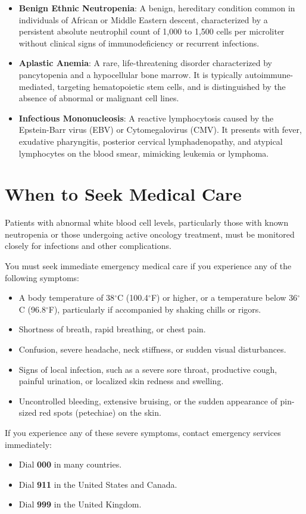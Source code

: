\begin{itemize}
  \item \textbf{Benign Ethnic Neutropenia}: A benign, hereditary condition common in individuals of African or Middle Eastern descent, characterized by a persistent absolute neutrophil count of 1,000 to 1,500 cells per microliter without clinical signs of immunodeficiency or recurrent infections.
  \item \textbf{Aplastic Anemia}: A rare, life-threatening disorder characterized by pancytopenia and a hypocellular bone marrow. It is typically autoimmune-mediated, targeting hematopoietic stem cells, and is distinguished by the absence of abnormal or malignant cell lines.
  \item \textbf{Infectious Mononucleosis}: A reactive lymphocytosis caused by the Epstein-Barr virus (EBV) or Cytomegalovirus (CMV). It presents with fever, exudative pharyngitis, posterior cervical lymphadenopathy, and atypical lymphocytes on the blood smear, mimicking leukemia or lymphoma.
\end{itemize}

\section*{When to Seek Medical Care}
Patients with abnormal white blood cell levels, particularly those with known neutropenia or those undergoing active oncology treatment, must be monitored closely for infections and other complications.

You must seek immediate emergency medical care if you experience any of the following symptoms:
\begin{itemize}
  \item A body temperature of 38$^\circ$C (100.4$^\circ$F) or higher, or a temperature below 36$^\circ$C (96.8$^\circ$F), particularly if accompanied by shaking chills or rigors.
  \item Shortness of breath, rapid breathing, or chest pain.
  \item Confusion, severe headache, neck stiffness, or sudden visual disturbances.
  \item Signs of local infection, such as a severe sore throat, productive cough, painful urination, or localized skin redness and swelling.
  \item Uncontrolled bleeding, extensive bruising, or the sudden appearance of pin-sized red spots (petechiae) on the skin.
\end{itemize}

If you experience any of these severe symptoms, contact emergency services immediately:
\begin{itemize}
  \item Dial \textbf{000} in many countries.
  \item Dial \textbf{911} in the United States and Canada.
  \item Dial \textbf{999} in the United Kingdom.
\end{itemize}

